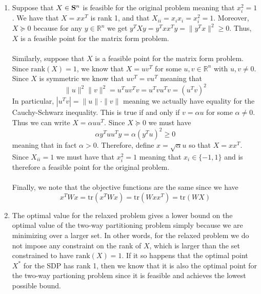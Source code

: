 \documentclass[11pt]{amsart}
\begin{document}
\begin{enumerate}
\begin{enumerate}
\item Suppose that $X \in {\bf S}^n$ is feasible for the original problem meaning that $x_i^2 = 1$.  We have that $X = xx^T$ is rank 1, and that $X_{ii} = x_ix_i = x_i^2 = 1$.  Moreover, $X \succeq 0$ because for any $y\in \mathbb{R}^n$ we get $y^TXy = y^Txx^Ty = \|y^Tx\|^2 \ge 0$.  Thus, $X$ is a feasible point for the matrix form problem.\\
\\

Similarly, suppose that $X$ is a feasible point for the matrix form problem.  Since $\mathrm{rank}(X) = 1$, we know that $X = uv^T$ for some $u,v \in \mathbb{R}^n$ with $u,v \neq 0$.  Since $X$ is symmetric we know that $uv^T = vu^T$ meaning that
\[
\|u\|^2\|v\|^2 = u^Tuv^Tv = u^Tvu^Tv = (u^Tv)^2
\]
In particular, $|u^Tv| = \|u\|\cdot \|v\|$ meaning we actually have equality for the Cauchy-Schwarz inequality.  This is true if and only if $v = \alpha u$ for some $\alpha \neq 0$.  Thus we can write $X = \alpha uu^T$.  Since $X \succeq 0$ we must have
\[
\alpha y^T uu^Ty = \alpha (y^Tu)^2 \ge 0
\]
meaning that in fact $\alpha > 0$.  Therefore, define $x = \sqrt{\alpha}u$ so that $X = xx^T$.  Since $X_{ii} = 1$ we must have that $x_i^2 = 1$ meaning that $x_i \in \{-1,1\}$ and is therefore a feasible point for the original problem.\\
\\
Finally, we note that the objective functions are the same since we have
\[
x^TWx = \mathrm{tr}(x^TWx) =  \mathrm{tr}(Wxx^T) =  \mathrm{tr}(WX)
\]






\item The optimal value for the relaxed problem gives a lower bound on the optimal value of the two-way partitioning problem simply because we are minimizing over a larger set.  In other words, for the relaxed problem we do not impose any constraint on the rank of $X$, which is larger than the set constrained to have $\mathrm{rank}(X) = 1$.  If it so happens that the optimal point $X^*$ for the SDP has rank 1, then we know that it is also the optimal point for the two-way partioning problem since it is feasible and achieves the lowest possible bound.





\end{enumerate}
\end{enumerate}
\end{document}
